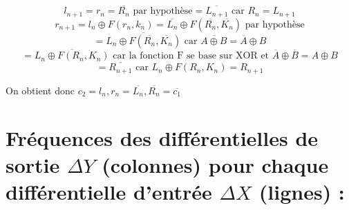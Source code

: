 \documentclass[fleqn]{article}
\begin{document}
\[l_{n+1} = r_n = \overline{R_n} \text{ par hypothèse} = \boxed{\overline{L_{n+1}}} \text{ car } R_n = L_{n+1}\] 
\[r_{n+1} = l_n \oplus F(r_n, k_n) = \overline{L_n} \oplus F(\overline{R_n}, \overline{K_n}) \text{ par hypothèse}\]
\[= \overline{L_n \oplus F(\overline{R_n}, \overline{K_n})} \text{ car } \overline{A \oplus B} = \overline{A} \oplus B\]
\[= \overline{L_n \oplus F(R_n, K_n)} \text{ car la fonction F se base sur XOR et } \overline{A} \oplus \overline{B} = A \oplus B\]
\[= \boxed{\overline{R_{n+1}}} \text{ car } L_n \oplus F(R_n, K_n) = R_{n+1}\]\newline

\noindent On obtient donc $\boxed{c_2 = l_n, r_n = \overline{L_n}, \overline{R_n} = \overline{c_1}}$
\section{\normalsize Fréquences des différentielles de sortie $\Delta Y$
(colonnes) pour chaque différentielle d’entrée $\Delta X$ (lignes) :\newline\newline\newline}
\end{document}
